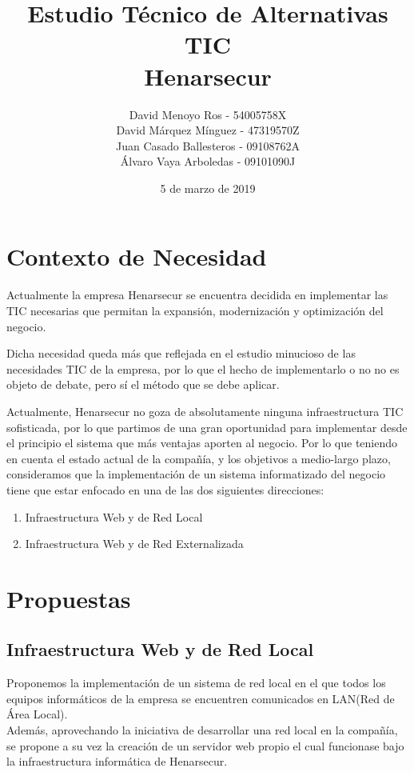 \documentclass[12pt,letterpaper]{article}
\title{Estudio Técnico de Alternativas TIC \\ Henarsecur}
\author{David Menoyo Ros - 54005758X\\
		David Márquez Mínguez - 47319570Z\\
		Juan Casado Ballesteros - 09108762A\\
		Álvaro Vaya Arboledas - 09101090J\\
		}
\date{5 de marzo de 2019}
\begin{document}
	\maketitle %
			   
	\newpage
	\section{Contexto de Necesidad}
	Actualmente la empresa Henarsecur se encuentra decidida en implementar las TIC necesarias que permitan la expansión, modernización y optimización del negocio.\par
	Dicha necesidad queda más que reflejada en el estudio minucioso de las necesidades TIC de la empresa, por lo que el hecho de implementarlo o no no es objeto de debate, pero sí el método que se debe aplicar.\par
	Actualmente, Henarsecur no goza de absolutamente ninguna infraestructura TIC sofisticada, por lo que partimos de una gran oportunidad para implementar desde el principio el sistema que más ventajas aporten al negocio. Por lo que teniendo en cuenta el estado actual de la compañía, y los objetivos a medio-largo plazo, consideramos que la implementación de un sistema informatizado del negocio tiene que estar enfocado en una de las dos siguientes direcciones:
	\begin{enumerate}
	\item Infraestructura Web y de Red Local
	\item Infraestructura Web y de Red Externalizada
	\end{enumerate}
	
	\section{Propuestas}
	\subsection{Infraestructura Web y de Red Local}
	
	Proponemos la implementación de un sistema de red local en el que todos los equipos informáticos de la empresa se encuentren comunicados en LAN(Red de Área Local).\\
	Además, aprovechando la iniciativa de desarrollar una red local en la compañía, se propone a su vez la creación de un servidor web propio el cual funcionase bajo la infraestructura informática de Henarsecur.\par
\end{document}

